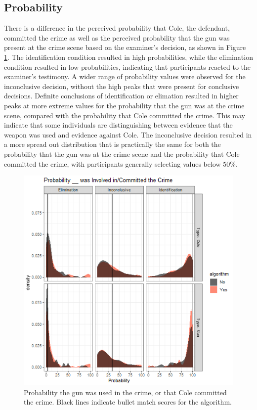 \documentclass[print]{nuthesis}
\begin{document}
\hypertarget{probability}{%
\subsection{Probability}\label{probability}}

There is a difference in the perceived probability that Cole, the defendant, committed the crime as well as the perceived probability that the gun was present at the crime scene based on the examiner's decision, as shown in Figure \ref{fig:probalgorithm}.
The identification condition resulted in high probabilities, while the elimination condition resulted in low probabilities, indicating that participants reacted to the examiner's testimony.
A wider range of probability values were observed for the inconclusive decision, without the high peaks that were present for conclusive decisions.
Definite conclusions of identification or elimation resulted in higher peaks at more extreme values for the probability that the gun was at the crime scene, compared with the probability that Cole committed the crime.
This may indicate that some individuals are distinguishing between evidence that the weapon was used and evidence against Cole.
The inconclusive decision resulted in a more spread out distribution that is practically the same for both the probability that the gun was at the crime scene and the probability that Cole committed the crime, with participants generally selecting values below 50\%.

\begin{figure}

{\centering \includegraphics[width=\linewidth]{images/probalgorithm} 

}

\caption{Probability the gun was used in the crime, or that Cole committed the crime. Black lines indicate bullet match scores for the algorithm.}\label{fig:probalgorithm}
\end{figure}
\end{document}
